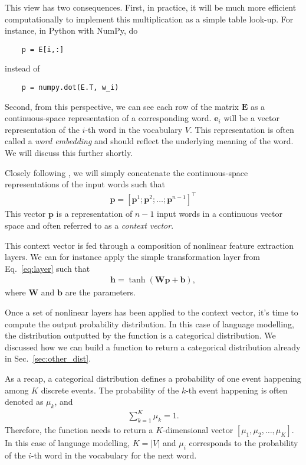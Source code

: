 \documentclass{report}
\newcommand{\vect}[1]{\mathbf{#1}}
\newcommand{\matr}[1]{\mathbf{#1}}
\newcommand{\vb}[0]{\vect{b}}
\newcommand{\ve}[0]{\vect{e}}
\newcommand{\vh}[0]{\vect{h}}
\newcommand{\vp}[0]{\vect{p}}
\newcommand{\mW}[0]{\matr{W}}
\newcommand{\mE}[0]{\matr{E}}
\begin{document}
This view has two consequences. First, in practice, it will be much more
efficient computationally to implement this multiplication as a simple table
look-up. For instance, in Python with NumPy, do
\begin{verbatim}
    p = E[i,:]
\end{verbatim}
instead of
\begin{verbatim}
    p = numpy.dot(E.T, w_i)
\end{verbatim}

Second, from this perspective, we can see each row of the matrix $\mE$ as a
continuous-space representation of a corresponding word. $\ve_i$ will be a
vector representation of the $i$-th word in the vocabulary $V$. This
representation is often called a \emph{word embedding} and should reflect the
underlying meaning of the word. We will discuss this further shortly.

Closely following \citet{bengio2006neural}, we will simply concatenate the
continuous-space representations of the input words such that
\begin{align*}
    \vp = \left[ \vp^1; \vp^2; \ldots; \vp^{n-1}\right]^\top
\end{align*}
This vector $\vp$ is a representation of $n-1$ input words in a continuous
vector space and often referred to as a {\em context vector}.

This context vector is fed through a composition of nonlinear feature extraction
layers. We can for instance apply the simple transformation layer from
Eq.~\eqref{eq:layer} such that
\begin{align}
    \label{eq:nlm_context}
    \vh = \tanh(\mW \vp + \vb),
\end{align}
where $\mW$ and $\vb$ are the parameters. 

Once a set of nonlinear layers has been applied to the context vector, it's time
to compute the output probability distribution. In this case of language
modelling, the distribution outputted by the function is a categorical
distribution. We discussed how we can build a function to return a categorical
distribution already in Sec.~\ref{sec:other_dist}. 

As a recap, a categorical distribution defines a probability of one event
happening among $K$ discrete events. The probability of the $k$-th event
happening is often denoted as $\mu_k$, and
\begin{align*}
    \sum_{k=1}^K \mu_k = 1.
\end{align*}
Therefore, the function needs to return a $K$-dimensional vector $[\mu_1,\mu_2,
\ldots, \mu_K ]$. In this case of language modelling, $K=|V|$ and $\mu_i$
corresponds to the probability of the $i$-th word in the vocabulary for the next
word.
\end{document}
